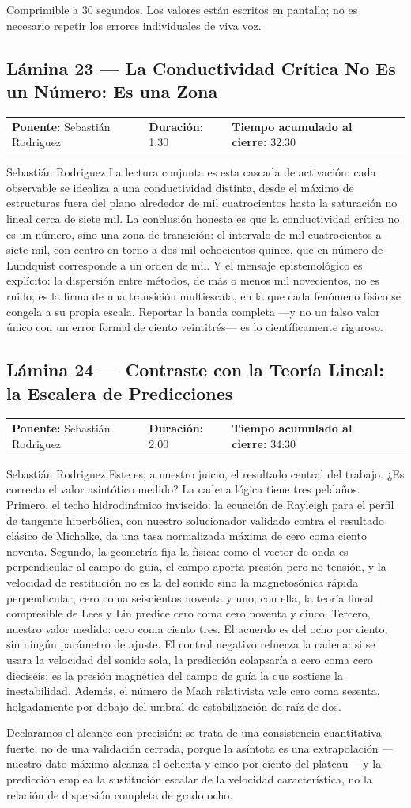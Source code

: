 \documentclass[11pt,letterpaper]{article}
\makeatletter
\newcommand{\lamina}[5]{%
  \subsection*{Lámina #1 --- #2}
  \noindent
  \begin{tabular}{@{}llll@{}}
    \textbf{Ponente:} #3 &\quad \textbf{Duración:} #4 &\quad
    \textbf{Tiempo acumulado al cierre:} #5 &
  \end{tabular}
  \vspace{2pt}}
\makeatother
\begin{document}
\begin{indicaciones}
Comprimible a 30 segundos. Los valores están escritos en pantalla; no es
necesario repetir los errores individuales de viva voz.
\end{indicaciones}

\lamina{23}{La Conductividad Crítica No Es un Número: Es una Zona}{Sebastián Rodriguez}{1:30}{32:30}

\begin{parlamento}{Sebastián Rodriguez}
La lectura conjunta es esta cascada de activación: cada observable se
idealiza a una conductividad distinta, desde el máximo de estructuras fuera
del plano alrededor de mil cuatrocientos hasta la saturación no lineal
cerca de siete mil. La conclusión honesta es que la conductividad crítica
no es un número, sino una zona de transición: el intervalo de mil
cuatrocientos a siete mil, con centro en torno a dos mil ochocientos
quince, que en número de Lundquist corresponde a un orden de mil. Y el
mensaje epistemológico es explícito: la dispersión entre métodos, de más o
menos mil novecientos, no es ruido; es la firma de una transición
multiescala, en la que cada fenómeno físico se congela a su propia escala.
Reportar la banda completa ---y no un falso valor único con un error formal
de ciento veintitrés--- es lo científicamente riguroso.
\end{parlamento}

\lamina{24}{Contraste con la Teoría Lineal: la Escalera de Predicciones}{Sebastián Rodriguez}{2:00}{34:30}

\begin{parlamento}{Sebastián Rodriguez}
Este es, a nuestro juicio, el resultado central del trabajo. ¿Es correcto el
valor asintótico medido? La cadena lógica tiene tres peldaños. Primero, el
techo hidrodinámico inviscido: la ecuación de Rayleigh para el perfil de
tangente hiperbólica, con nuestro solucionador validado contra el resultado
clásico de Michalke, da una tasa normalizada máxima de cero coma ciento
noventa. Segundo, la geometría fija la física: como el vector de onda es
perpendicular al campo de guía, el campo aporta presión pero no tensión, y
la velocidad de restitución no es la del sonido sino la magnetosónica
rápida perpendicular, cero coma seiscientos noventa y uno; con ella, la
teoría lineal compresible de Lees y Lin predice cero coma cero noventa y
cinco. Tercero, nuestro valor medido: cero coma ciento tres. El acuerdo es
del ocho por ciento, sin ningún parámetro de ajuste. El control negativo
refuerza la cadena: si se usara la velocidad del sonido sola, la predicción
colapsaría a cero coma cero dieciséis; es la presión magnética del campo de
guía la que sostiene la inestabilidad. Además, el número de Mach
relativista vale cero coma sesenta, holgadamente por debajo del umbral de
estabilización de raíz de dos.

Declaramos el alcance con precisión: se trata de una consistencia
cuantitativa fuerte, no de una validación cerrada, porque la asíntota es
una extrapolación ---nuestro dato máximo alcanza el ochenta y cinco por
ciento del plateau--- y la predicción emplea la sustitución escalar de la
velocidad característica, no la relación de dispersión completa de grado
ocho.
\end{parlamento}
\end{document}
